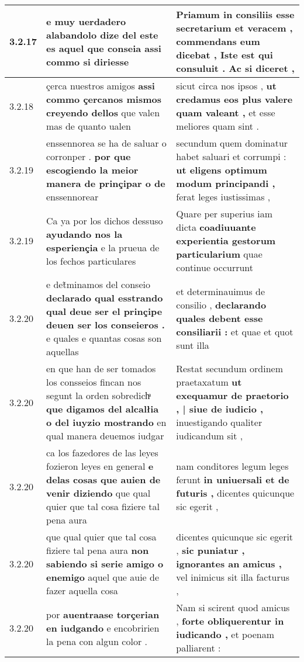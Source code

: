 \begin{tabular}{|p{1cm}|p{6.5cm}|p{6.5cm}|}
3.2.17 & e muy uerdadero \textbf{ alabandolo dize del este es aquel que conseia } assi commo si diriesse & Priamum in consiliis esse secretarium et veracem , commendans eum dicebat , \textbf{ Iste est qui consuluit . } Ac si diceret , \\\hline
3.2.18 & çerca nuestros amigos \textbf{ assi commo çercanos mismos creyendo dellos } que valen mas de quanto ualen & sicut circa nos ipsos , \textbf{ ut credamus eos plus valere quam valeant , } et esse meliores quam sint . \\\hline
3.2.19 & enssennorea se ha de saluar o corronper . \textbf{ por que escogiendo la meior manera de prinçipar o de } enssennorear & secundum quem dominatur habet saluari et corrumpi : \textbf{ ut eligens optimum modum principandi , } ferat leges iustissimas , \\\hline
3.2.19 & Ca ya por los dichos dessuso \textbf{ ayudando nos la esperiençia } e la prueua de los fechos particulares & Quare per superius iam dicta \textbf{ coadiuuante experientia gestorum particularium } quae continue occurrunt \\\hline
3.2.20 & e det̃minamos del conseio \textbf{ declarado qual esstrando qual deue ser el prinçipe deuen ser los conseieros . } e quales e quantas cosas son aquellas & et determinauimus de consilio , \textbf{ declarando quales debent esse consiliarii : } et quae et quot sunt illa \\\hline
3.2.20 & en que han de ser tomados los consseios fincan nos segunt la orden sobredichͣ \textbf{ que digamos del alcalłia o del iuyzio mostrando } en qual manera deuemos iudgar & Restat secundum ordinem praetaxatum \textbf{ ut exequamur de praetorio , | siue de iudicio , } inuestigando qualiter iudicandum sit , \\\hline
3.2.20 & ca los fazedores de las leyes fozieron leyes en general \textbf{ e delas cosas que auien de venir diziendo } que qual quier que tal cosa fiziere tal pena aura & nam conditores legum leges ferunt \textbf{ in uniuersali et de futuris , } dicentes quicunque sic egerit , \\\hline
3.2.20 & que qual quier que tal cosa fiziere tal pena aura \textbf{ non sabiendo si serie amigo o enemigo } aquel que auie de fazer aquella cosa & dicentes quicunque sic egerit , \textbf{ sic puniatur , ignorantes an amicus , } vel inimicus sit illa facturus , \\\hline
3.2.20 & por \textbf{ auentraase torçerian en iudgando } e encobririen la pena con algun color . & Nam si scirent quod amicus , \textbf{ forte obliquerentur in iudicando , } et poenam palliarent : \\\hline

\end{tabular}
